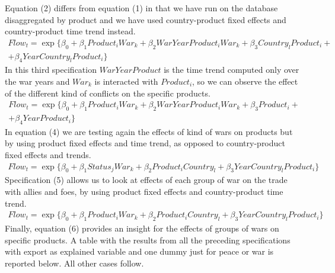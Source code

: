 \documentclass[12pt,a4paper,titlepage,english]{article}
\begin{document}
Equation (2) differs from equation (1) in that we have run on the database disaggregated by product and we have used country-product fixed effects and country-product time trend instead.  
\begin{multline}
Flow_{t}=\exp\{\beta_0+\beta_1Product_iWar_k + \beta_2WarYearProduct_iWar_k+\beta_3Country_lProduct_i +\\ +\beta_4YearCountry_lProduct_i\}
\end{multline}
In this third specification $WarYearProduct$ is the time trend computed only over the war years and $War_k$ is interacted with $Product_i$, so we can observe the effect of the different kind of conflicts on the specific products. 
\begin{multline}
Flow_{t}=\exp\{\beta_0+\beta_1Product_iWar_k + \beta_2WarYearProduct_iWar_k+\beta_3Product_i +\\ +\beta_4YearProduct_i\}
\end{multline}
In equation (4) we are testing again the effects of kind of wars on products but by using product fixed effects and time trend, as opposed to country-product fixed effects and trends. 
\begin{multline}
Flow_{t}=\exp\{\beta_0+\beta_1Status_jWar_k + \beta_2Product_iCountry_l+\beta_3YearCountry_lProduct_i\}
\end{multline}
Specification (5) allows us to look at effects of each group of war on the trade with allies and foes, by using product fixed effects and country-product time trend.
\begin{multline}
Flow_{t}=\exp\{\beta_0+\beta_1Product_iWar_k + \beta_2Product_iCountry_l+\beta_3YearCountry_lProduct_i\}
\end{multline}
Finally, equation (6) provides an insight for the effects of groups of wars on specific products. A table with the results from all the preceding specifications with export as explained variable and one dummy just for peace or war is reported below. All other cases follow. \\
\begin{center}

\end{center}
\end{document}
